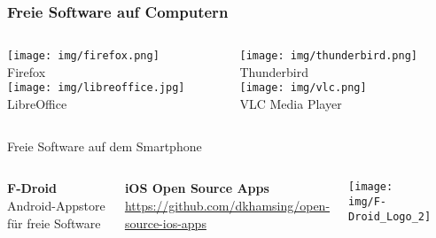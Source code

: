 \begin{frame}
  \frametitle{Freie Software auf Computern}
    \begin{columns}
        \begin{column}{5cm}
            \begin{center}
                \texttt{[image: img/firefox.png]} \\
                Firefox \\
                \vspace{0.1\textheight}
                \texttt{[image: img/libreoffice.jpg]}\\
                LibreOffice
            \end{center}
        \end{column}
        \begin{column}{5cm}
            \begin{center}
                \texttt{[image: img/thunderbird.png]} \\
                Thunderbird \\
                \vspace{0.1\textheight}
                \texttt{[image: img/vlc.png]}\\
                VLC Media Player
            \end{center}
        \end{column}
    \end{columns}
\end{frame}

\begin{frame}{Freie Software auf dem Smartphone}
  \begin{columns}
    \column{6.5cm}

    \textbf{F-Droid}\\
    Android-Appstore für freie Software

    \vspace{0.5cm}

    \textbf{iOS Open Source Apps}\\
    \url{https://github.com/dkhamsing/open-source-ios-apps}

    \column{5cm}

    \begin{center}
      \texttt{[image: img/F-Droid\_Logo\_2]}
    \par\end{center}
    \begin{center}
    \par\end{center}
  \end{columns}
\end{frame}
